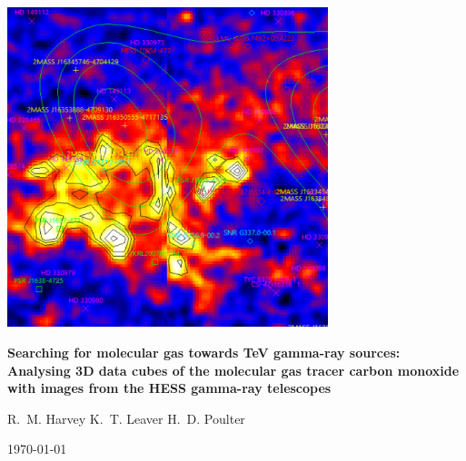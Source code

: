 \begin{titlepage}
\begin{center}
~

\vfill

\includegraphics[width = 0.7\textwidth]{figures/cover-pic}

\vspace{1em}

\begin{spacing}{1.9}
{\LARGE \textbf{Searching for molecular gas towards TeV gamma-ray sources: Analysing 3D data cubes of the molecular gas tracer carbon monoxide with images from the HESS gamma-ray telescopes}}

\vspace{2.5em}

{\large R.~M. Harvey \quad\quad\quad K.~T. Leaver \quad\quad\quad H.~D. Poulter}
\end{spacing}

\vspace{1em}

{\large \today}

\vfill

~

\end{center}
\end{titlepage}